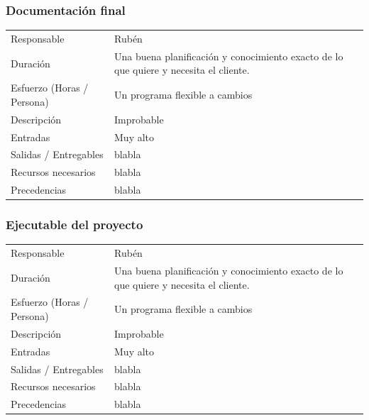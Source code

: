 \subsubsection{Documentaci\'{o}n final}
\begin{table}[H]
    \begin{center}
        \begin{tabular}{l p{8cm}}
            Responsable                           & Rub\'{e}n \\
            Duraci\'{o}n                          & Una buena planificación y conocimiento exacto de lo que quiere y necesita el cliente. \\ 
            Esfuerzo (Horas / Persona)            & Un programa flexible a cambios \\
            Descripci\'{o}n                       & Improbable \\
            Entradas                              & Muy alto\\
            Salidas / Entregables                 & blabla \\
            Recursos necesarios                   & blabla \\
            Precedencias                          & blabla \\
        \end{tabular}
    \end{center}
    
\end{table}

\subsubsection{Ejecutable del proyecto}
\begin{table}[H]
    \begin{center}
        \begin{tabular}{l p{8cm}}
            Responsable                           & Rub\'{e}n \\
            Duraci\'{o}n                          & Una buena planificación y conocimiento exacto de lo que quiere y necesita el cliente. \\ 
            Esfuerzo (Horas / Persona)            & Un programa flexible a cambios \\
            Descripci\'{o}n                       & Improbable \\
            Entradas                              & Muy alto\\
            Salidas / Entregables                 & blabla \\
            Recursos necesarios                   & blabla \\
            Precedencias                          & blabla \\
        \end{tabular}
    \end{center}
    
\end{table}

